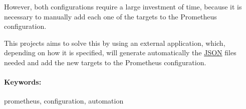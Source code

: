 However, both configurations require a large investment of time, because it is necessary to manually add each one of the targets to the Prometheus configuration.

This projects aims to solve this by using an external application, which, depending on how it is specified, will generate automatically the \url{JSON} files needed and add the new targets to the Prometheus configuration.

\paragraph*{Keywords:} prometheus, configuration, automation